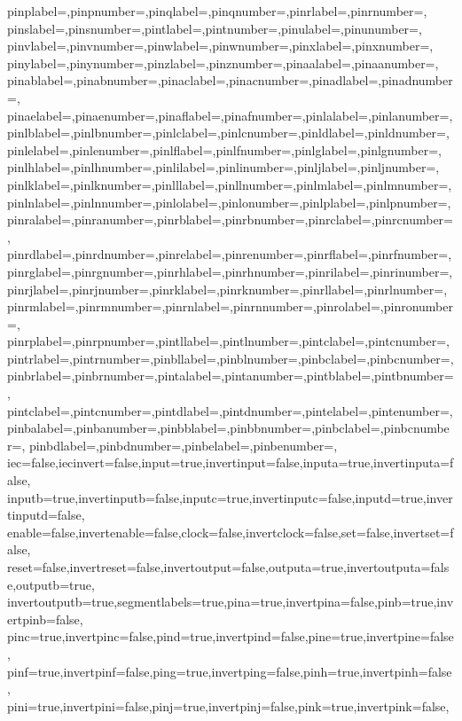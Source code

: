 {  pinplabel={},pinpnumber={},pinqlabel={},pinqnumber={},pinrlabel={},pinrnumber={},
  pinslabel={},pinsnumber={},pintlabel={},pintnumber={},pinulabel={},pinunumber={},
  pinvlabel={},pinvnumber={},pinwlabel={},pinwnumber={},pinxlabel={},pinxnumber={},
  pinylabel={},pinynumber={},pinzlabel={},pinznumber={},pinaalabel={},pinaanumber={},
  pinablabel={},pinabnumber={},pinaclabel={},pinacnumber={},pinadlabel={},pinadnumber={},
  pinaelabel={},pinaenumber={},pinaflabel={},pinafnumber={},pinlalabel={},pinlanumber={},
  pinlblabel={},pinlbnumber={},pinlclabel={},pinlcnumber={},pinldlabel={},pinldnumber={},
  pinlelabel={},pinlenumber={},pinlflabel={},pinlfnumber={},pinlglabel={},pinlgnumber={},
  pinlhlabel={},pinlhnumber={},pinlilabel={},pinlinumber={},pinljlabel={},pinljnumber={},
  pinlklabel={},pinlknumber={},pinlllabel={},pinllnumber={},pinlmlabel={},pinlmnumber={},
  pinlnlabel={},pinlnnumber={},pinlolabel={},pinlonumber={},pinlplabel={},pinlpnumber={},
  pinralabel={},pinranumber={},pinrblabel={},pinrbnumber={},pinrclabel={},pinrcnumber={},
  pinrdlabel={},pinrdnumber={},pinrelabel={},pinrenumber={},pinrflabel={},pinrfnumber={},
  pinrglabel={},pinrgnumber={},pinrhlabel={},pinrhnumber={},pinrilabel={},pinrinumber={},
  pinrjlabel={},pinrjnumber={},pinrklabel={},pinrknumber={},pinrllabel={},pinrlnumber={},
  pinrmlabel={},pinrmnumber={},pinrnlabel={},pinrnnumber={},pinrolabel={},pinronumber={},
  pinrplabel={},pinrpnumber={},pintllabel={},pintlnumber={},pintclabel={},pintcnumber={},
  pintrlabel={},pintrnumber={},pinbllabel={},pinblnumber={},pinbclabel={},pinbcnumber={},
  pinbrlabel={},pinbrnumber={},pintalabel={},pintanumber={},pintblabel={},pintbnumber={},
  pintclabel={},pintcnumber={},pintdlabel={},pintdnumber={},pintelabel={},pintenumber={},
  pinbalabel={},pinbanumber={},pinbblabel={},pinbbnumber={},pinbclabel={},pinbcnumber={},
  pinbdlabel={},pinbdnumber={},pinbelabel={},pinbenumber={},
  iec=false,iecinvert=false,input=true,invertinput=false,inputa=true,invertinputa=false,
  inputb=true,invertinputb=false,inputc=true,invertinputc=false,inputd=true,invertinputd=false,
  enable=false,invertenable=false,clock=false,invertclock=false,set=false,invertset=false,
  reset=false,invertreset=false,invertoutput=false,outputa=true,invertoutputa=false,outputb=true,
  invertoutputb=true,segmentlabels=true,pina=true,invertpina=false,pinb=true,invertpinb=false,
  pinc=true,invertpinc=false,pind=true,invertpind=false,pine=true,invertpine=false,
  pinf=true,invertpinf=false,ping=true,invertping=false,pinh=true,invertpinh=false,
  pini=true,invertpini=false,pinj=true,invertpinj=false,pink=true,invertpink=false,
}
